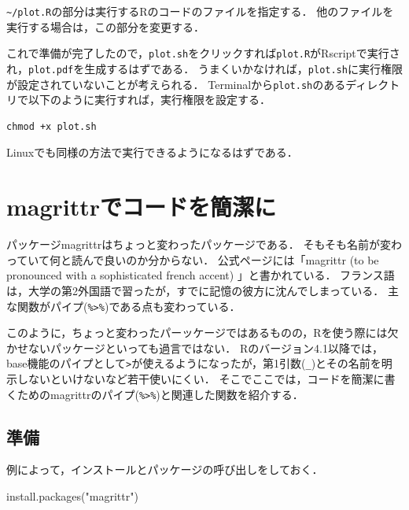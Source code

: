 \documentclass[
]{article}
\newenvironment{Shaded}{\begin{snugshade}}{\end{snugshade}}
\newcommand{\FunctionTok}[1]{\textcolor[rgb]{0.00,0.00,0.00}{#1}}
\newcommand{\NormalTok}[1]{#1}
\newcommand{\StringTok}[1]{\textcolor[rgb]{0.31,0.60,0.02}{#1}}
\begin{document}
\texttt{\textasciitilde{}/plot.R}の部分は実行するRのコードのファイルを指定する．
他のファイルを実行する場合は，この部分を変更する．

これで準備が完了したので，\texttt{plot.sh}をクリックすれば\texttt{plot.R}がRscriptで実行され，\texttt{plot.pdf}を生成するはずである．
うまくいかなければ，\texttt{plot.sh}に実行権限が設定されていないことが考えられる．
Terminalから\texttt{plot.sh}のあるディレクトリで以下のように実行すれば，実行権限を設定する．

\begin{verbatim}
chmod +x plot.sh
\end{verbatim}

Linuxでも同様の方法で実行できるようになるはずである．

\hypertarget{magrittr}{%
\section{magrittrでコードを簡潔に}\label{magrittr}}

パッケージmagrittrはちょっと変わったパッケージである．
そもそも名前が変わっていて何と読んで良いのか分からない．
公式ページには「magrittr (to be pronounced with a sophisticated french accent) 」と書かれている．
フランス語は，大学の第2外国語で習ったが，すでに記憶の彼方に沈んでしまっている．
主な関数がパイプ(\texttt{\%\textgreater{}\%})である点も変わっている．

このように，ちょっと変わったパーッケージではあるものの，Rを使う際には欠かせないパッケージといっても過言ではない．
Rのバージョン4.1以降では，base機能のパイプとして\texttt{\textbar{}\textgreater{}}が使えるようになったが，第1引数(\texttt{\_})とその名前を明示しないといけないなど若干使いにくい．
そこでここでは，コードを簡潔に書くためのmagrittrのパイプ(\texttt{\%\textgreater{}\%})と関連した関数を紹介する．

\hypertarget{ux6e96ux5099}{%
\subsection{準備}\label{ux6e96ux5099}}

例によって，インストールとパッケージの呼び出しをしておく．

\begin{Shaded}
\begin{Highlighting}[]
\FunctionTok{install.packages}\NormalTok{(}\StringTok{"magrittr"}\NormalTok{)}
\end{Highlighting}
\end{Shaded}
\end{document}

